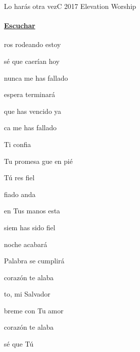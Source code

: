 \documentclass[12pt, spanish]{book}
\begin{document}
    \begin{song}{Lo harás otra vez}{C}
    {2017} %
    {Elevation Worship}
    {} %
    {}
    \ifChordBk
        \paragraph{\mbox{}\hfill\protect\href{https://open.spotify.com/intl-es/track/3vcfHBHNmN5LG8otn8j4Kg}{Escuchar}\mbox{}\hfill}
    \fi


    \begin{SBOpGroup}
        ros rodeando estoy

        sé que caerían hoy

         nunca me has fallado 

         espera terminará

         que has vencido ya

        ca me has fallado 
    \end{SBOpGroup}

    \begin{SBChorus}
         Ti confia

        Tu promesa gue en pié

        Tú res fiel

        fiado anda

        en Tus manos esta

        siem has sido fiel 
    \end{SBChorus}

    \begin{SBOpGroup}
         noche acabará

         Palabra se cumplirá

         corazón te alaba 

        to, mi Salvador

        breme con Tu amor

         corazón te alaba 
    \end{SBOpGroup}
    \begin{SBOpGroup}
         sé que Tú


\end{SBOpGroup}
\end{song}
\end{document}
